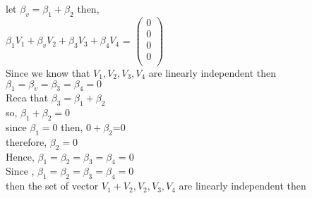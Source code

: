 \documentclass{article}
\begin{document}
let $\beta_v=\beta_1+\beta_2$ then,\\

$\beta_1 V_1+ \beta_v  V_2+\beta_3 V_3+ \beta_4 V_4$ =
$\begin{pmatrix}
0\\0\\0\\0\\
\end{pmatrix}$\\
Since we know that $V_1,V_2,V_3,V_4$ are linearly independent then \\ $\beta_1=\beta_v=\beta_3=\beta_4=0$\\
Reca that $\beta_3=\beta_1+\beta_2$\\
so, $\beta_1+\beta_2=0$\\ 
since $\beta_1=0$ then, $0+\beta_2$=0\\  
therefore, $\beta_2=0$\\
Hence, $\beta_1=\beta_2=\beta_3=\beta_4=0$\\ 
Since , $\beta_1=\beta_2=\beta_3=\beta_4=0$\\ 
then the set of vector  {$V_1+V_2,V_2,V_3,V_4$} are linearly independent then 
\end{document}

